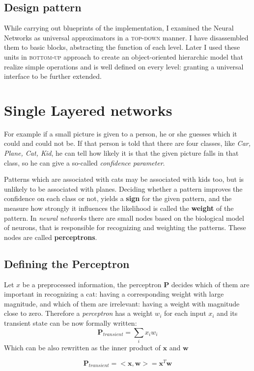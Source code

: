 \subsection{Design pattern} While carrying out blueprints of the implementation, I examined the Neural Networks as universal approximators in a \textsc{top-down} manner.
I have disassembled them to basic blocks, abstracting the function of each level.
Later I used these units in \textsc{bottom-up} approach to create an object-oriented hierarchic model that realize simple operations and is well defined on every level: granting a universal interface to be further extended.


\section{Single Layered networks}
For example if a small picture is given to a person, he or she guesses which it could and could not be. If that person is told that there are four classes, like \emph{Car, Plane, Cat, Kid}, he can tell how likely it is that the given picture falls in that class, so he can give a so-called \emph{confidence parameter}.

Patterns which are associated with cats may be associated with kids too, but is unlikely to be associated with planes. Deciding whether a pattern improves the confidence on each class or not, yields a \textbf{sign} for the given pattern, and the measure how strongly it influences the likelihood is called the \textbf{weight} of the pattern.
In \emph{neural networks} there are small nodes based on the biological model of neurons, that is responsible for recognizing and weighting the patterns. These nodes are called \textbf{perceptrons}. 

\subsection{Defining the Perceptron} 
Let $x$ be a preprocessed information, the perceptron $\mathbf{P}$ decides which of them are important in recognizing a cat: having a corresponding weight with large magnitude, and which of them are irrelevant: having a weight with magnitude close to zero. 
Therefore a \emph{perceptron} has a weight $w_i$ for each input $x_i$ and its transient state can be now formally written:
$$
	\mathbf{P}_{transient}=\sum_i x_i w_i
$$
Which can be also rewritten as the inner product of $\mathbf{x}$ and $\mathbf{w}$

$$
	\mathbf{P}_{transient}=<\mathbf{x}, \mathbf{w}>=\mathbf{x}^T\mathbf{w}
$$

